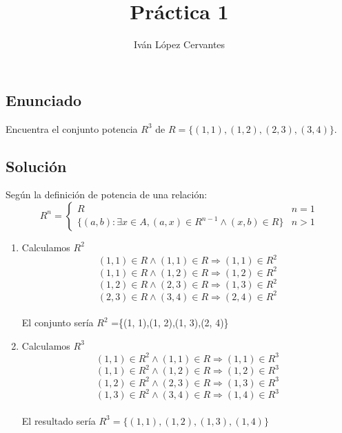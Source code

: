 \documentclass{article}
\title{Práctica 1}
\author{Iván López Cervantes}
\date{}
\begin{document}
\maketitle
\subsection*{Enunciado}
Encuentra el conjunto potencia $R^3$ de $R = \{(1, 1),(1, 2),(2, 3),(3, 4)\}$.
\subsection*{Solución}
Según la definición de potencia de una relación: 
\[
  R^n=
    \left\{
    \begin{array}{ll}
      R    & n=1 \\
      \{(a,b) : \exists x\in A,(a,x) \in R^{n-1} \land (x,b) \in R\}    & n>1
    \end{array}
    \right.
\]
\begin{enumerate}
    \item Calculamos $R^2$ 
    \begin{equation}
    (1, 1) \in  R \land (1, 1) \in  R \Rightarrow (1, 1) \in  R^2
    \end{equation}
    \begin{equation}
    (1, 1) \in  R \land (1, 2) \in  R \Rightarrow (1, 2) \in  R^2 
    \end{equation}
    \begin{equation}
    (1, 2) \in  R \land (2, 3) \in  R \Rightarrow (1, 3) \in  R^2 
    \end{equation}
    \begin{equation}
    (2, 3) \in  R \land (3, 4) \in  R \Rightarrow (2, 4) \in  R^2 
    \end{equation}
    \\El conjunto sería $R^2$ =\{(1, 1),(1, 2),(1, 3),(2, 4)\}\\

   
    \item Calculamos $R^3$
    \begin{equation}\tag{1}
    (1, 1) \in  R^2 \land (1, 1) \in  R  \Rightarrow (1, 1) \in  R^3
    \end{equation}
    \begin{equation}\tag{2}
    (1, 1) \in  R^2 \land (1, 2) \in  R  \Rightarrow (1, 2) \in  R^3
    \end{equation}
    \begin{equation}\tag{3}
    (1, 2) \in  R^2 \land (2, 3) \in  R  \Rightarrow (1, 3) \in  R^3
    \end{equation}
    \begin{equation}\tag{4}
    (1, 3) \in  R^2 \land (3, 4) \in  R  \Rightarrow (1, 4) \in  R^3
    \end{equation}
    \\El resultado sería $R^3 =\{(1, 1),(1, 2),(1, 3),(1, 4)\} $
    
\end{enumerate}
\end{document}
